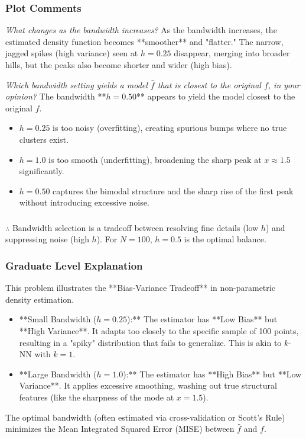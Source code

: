 \documentclass{article}
\begin{document}
\subsubsection*{Plot Comments}
\textit{What changes as the bandwidth increases?}
As the bandwidth increases, the estimated density function becomes **smoother** and "flatter." The narrow, jagged spikes (high variance) seen at $h=0.25$ disappear, merging into broader hills, but the peaks also become shorter and wider (high bias).

\textit{Which bandwidth setting yields a model $\widehat{f}$ that is closest to the original $f$, in your opinion?}
The bandwidth **$h=0.50$** appears to yield the model closest to the original $f$.
\begin{itemize}
    \item $h=0.25$ is too noisy (overfitting), creating spurious bumps where no true clusters exist.
    \item $h=1.0$ is too smooth (underfitting), broadening the sharp peak at $x \approx 1.5$ significantly.
    \item $h=0.50$ captures the bimodal structure and the sharp rise of the first peak without introducing excessive noise.
\end{itemize}

\subsubsection*{\normalfont}{$\therefore$ }
Bandwidth selection is a tradeoff between resolving fine details (low $h$) and suppressing noise (high $h$). For $N=100$, $h=0.5$ is the optimal balance.

\subsubsection*{Graduate Level Explanation}

This problem illustrates the **Bias-Variance Tradeoff** in non-parametric density estimation.
\begin{itemize}
    \item **Small Bandwidth ($h=0.25$):** The estimator has **Low Bias** but **High Variance**. It adapts too closely to the specific sample of 100 points, resulting in a "spiky" distribution that fails to generalize. This is akin to $k$-NN with $k=1$.
    \item **Large Bandwidth ($h=1.0$):** The estimator has **High Bias** but **Low Variance**. It applies excessive smoothing, washing out true structural features (like the sharpness of the mode at $x=1.5$).
\end{itemize}
The optimal bandwidth (often estimated via cross-validation or Scott's Rule) minimizes the Mean Integrated Squared Error (MISE) between $\hat{f}$ and $f$.
\end{document}
